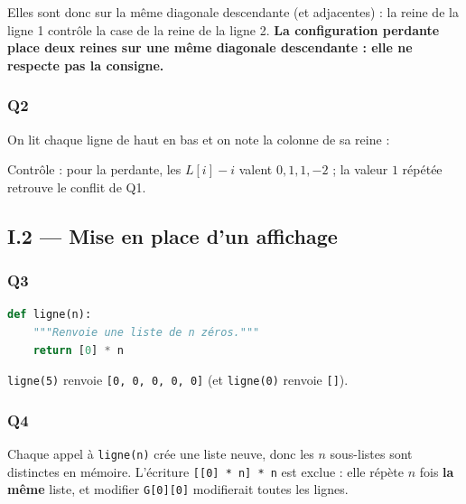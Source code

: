\documentclass[11pt,a4paper]{article}
\newcommand{\equationajustee}[1]{%
  \sbox{\boiteequation}{$\displaystyle #1$}%
  \ifdim\wd\boiteequation>\linewidth
    \[\resizebox{\linewidth}{!}{\usebox{\boiteequation}}\]%
  \else
    \[#1\]%
  \fi}
\begin{document}
Elles sont donc sur la même diagonale descendante (et adjacentes) : la reine de la ligne 1 contrôle la case de la reine de la ligne 2. \textbf{La configuration perdante place deux reines sur une même diagonale descendante : elle ne respecte pas la consigne.}

\hypertarget{q2}{%
\subsubsection{Q2}\label{q2}}

On lit chaque ligne de haut en bas et on note la colonne de sa reine :

\equationajustee{\boxed{\begin{aligned}{}&\text{gagnante : } L = [2, 0, 3, 1] \\
&\text{perdante : } L = [0, 2, 3, 1]
\end{aligned}}}

Contrôle : pour la perdante, les \(L[i] - i\) valent \(0, 1, 1, -2\) ; la valeur \(1\) répétée retrouve le conflit de Q1.

\hypertarget{i.2-mise-en-place-dun-affichage}{%
\subsection{I.2 --- Mise en place d'un affichage}\label{i.2-mise-en-place-dun-affichage}}

\hypertarget{q3}{%
\subsubsection{Q3}\label{q3}}

\begin{lstlisting}[language=Python]
def ligne(n):
    """Renvoie une liste de n zéros."""
    return [0] * n
\end{lstlisting}

\texttt{ligne(5)} renvoie \texttt{{[}0,\ 0,\ 0,\ 0,\ 0{]}} (et \texttt{ligne(0)} renvoie \texttt{{[}{]}}).

\hypertarget{q4}{%
\subsubsection{Q4}\label{q4}}

Chaque appel à \texttt{ligne(n)} crée une liste neuve, donc les \(n\) sous-listes sont distinctes en mémoire. L'écriture \texttt{{[}{[}0{]}\ *\ n{]}\ *\ n} est exclue : elle répète \(n\) fois \textbf{la même} liste, et modifier \texttt{G{[}0{]}{[}0{]}} modifierait toutes les lignes.
\end{document}
